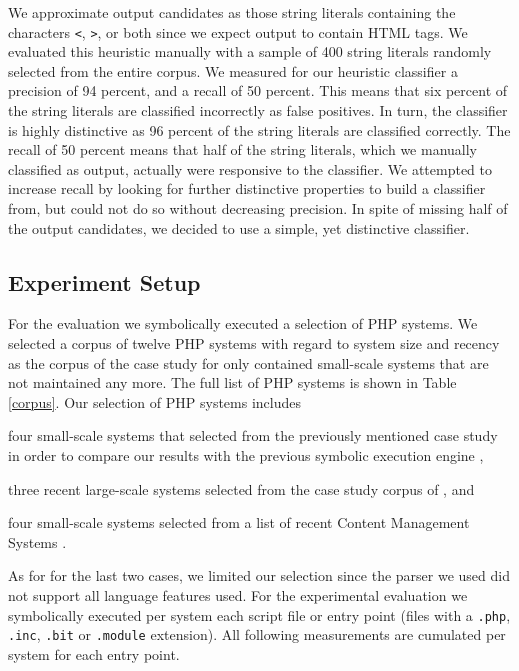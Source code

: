 \documentclass[preprint]{sig-alternate-05-2015}
\begin{document}
We approximate output candidates as those string literals containing the characters \texttt{<}, \texttt{>}, or both since we expect output to contain HTML tags. We evaluated this heuristic manually
with a sample of 400 string literals randomly selected from the entire corpus.
We measured for our heuristic classifier a precision of 94 percent, and a recall
of 50 percent. This means that six percent of the string literals are classified incorrectly as false positives. In turn, the classifier is highly distinctive as 96 percent of the string literals are classified correctly. The recall of 50 percent means that half of the string literals, which we manually classified as output, actually were responsive to the classifier. We attempted to increase recall by looking for further distinctive properties to build a classifier from, but could not do so without decreasing precision. In spite of missing half of the output candidates, we decided to use a simple, yet distinctive classifier.

\subsection{Experiment Setup} 
For the evaluation we symbolically executed a selection of PHP systems. We selected a corpus of twelve PHP systems with regard to system size and recency as the corpus of the case study for \cite{Nguyen:2014:BCG:2635868.2635928} only contained small-scale systems that are not maintained any more. The full list of PHP systems is shown in Table \ref{corpus}. Our selection of PHP systems includes
\begin{compactitem}
\item four small-scale systems that selected from the previously mentioned case study in order to compare our results with the previous symbolic execution engine \cite{Nguyen:2014:BCG:2635868.2635928},
\item three recent large-scale systems selected from the case study corpus of \cite{Hills:2013:ESP:2483760.2483786}, and
\item four small-scale systems selected from a list of recent Content Management Systems \cite{codegeekz}.

\end{compactitem}
As for for the last two cases, we limited our selection since the parser we
used did not support all language features used. For the experimental evaluation we symbolically executed per system each script file or entry point (files with a \texttt{.php}, \texttt{.inc}, \texttt{.bit} or \texttt{.module} extension). All following measurements are cumulated per system for each entry point. 
\end{document}
